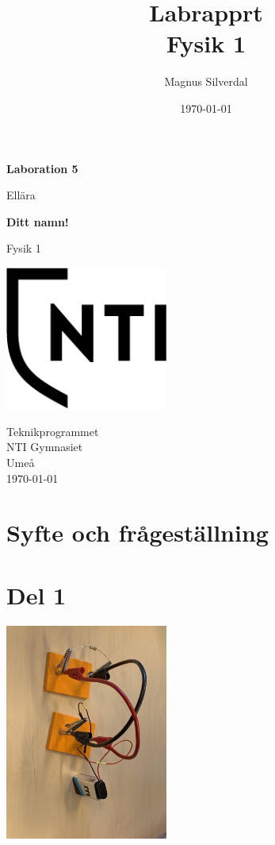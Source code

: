 \documentclass[11p]{article}
\title{Labrapprt \\ \small Fysik 1}
\author{Magnus Silverdal }
\date{\today}
\begin{document}
    \begin{titlepage}
        \begin{center}
            \vspace*{1cm}

            \Huge
            \textbf{Laboration 5}

            \vspace{0.5cm}
            \LARGE
            Ellära

            \vspace{1.5cm}

            \textbf{Ditt namn!}

            \vfill


            Fysik 1

            \vspace{0.8cm}

            \includegraphics[width=0.4\textwidth]{../images/NTI Gymnasiet_Symbol_print_svart.png}

            \Large
            Teknikprogrammet\\
            NTI Gymnasiet\\
            Umeå\\
            \today

        \end{center}
    \end{titlepage}
    \section{Syfte och frågeställning}
    \section{Del 1}
    \includegraphics[width=0.4\textwidth]{../images/Elbild.jpg}
\end{document}
